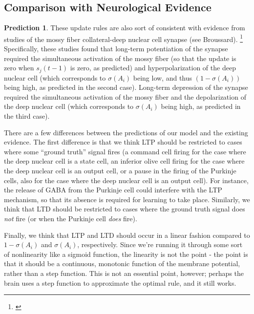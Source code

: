 \documentclass{article}
\theoremstyle{definition}
\newtheorem{pred}[thm]{Prediction}
\begin{document}
\subsection{Comparison with Neurological Evidence}
\label{sec-mf-dcn-neuro}

\begin{pred}
These update rules are also sort of consistent with evidence from
studies of the mossy fiber collateral-deep nuclear cell synapse (see
Broussard). \footnote{\cite{pugh-raman, person-raman,
    zhang-linden}} Specifically, these studies found that long-term
potentiation of the synapse required the simultaneous activation of
the mossy fiber (so that the update is zero when $s_j(t-1)$ is zero,
as predicted) and hyperpolarization of the deep nuclear cell (which
corresponds to $\sigma(A_i)$ being low, and thus $(1-\sigma(A_i))$
being high, as predicted in the second case). Long-term depression of
the synapse required the simultaneous activation of the mossy fiber
and the depolarization of the deep nuclear cell (which corresponds to
$\sigma(A_i)$ being high, as predicted in the third case).

There are a few differences between the predictions of our model and
the existing evidence. The first difference is that we think LTP
should be restricted to cases where some ``ground truth'' signal fires
(a command cell firing for the case where the deep nuclear cell is a
state cell, an inferior olive cell firing for the case where the deep
nuclear cell is an output cell, or a pause in the firing of the
Purkinje cells, also for the case where the deep nuclear cell is an
output cell). For instance, the release of GABA from the Purkinje cell
could interfere with the LTP mechanism, so that its absence is
required for learning to take place. Similarly, we think that LTD
should be restricted to cases where the ground truth signal does {\em
  not} fire (or when the Purkinje cell {\em does} fire).

Finally, we think that LTP and LTD should occur in a linear fashion
compared to $1-\sigma(A_i)$ and $\sigma(A_i)$, respectively. Since
we're running it through some sort of nonlinearity like a sigmoid
function, the linearity is not the point - the point is that it should
be a continuous, monotonic function of the membrane potential, rather
than a step function. This is not an essential point, however; perhaps
the brain uses a step function to approximate the optimal rule, and it
still works.
\end{pred}
\end{document}
